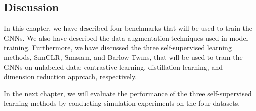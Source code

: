 \subsection{Discussion}

In this chapter, we have described four benchmarks that will be used to train the GNNs. We also have described the data augmentation techniques used in model training. Furthermore, we have discussed the three self-supervised learning methods, SimCLR, Simsiam, and Barlow Twins, that will be used to train the GNNs on unlabeled data: contrastive learning, distillation learning, and dimension reduction approach, respectively. 

In the next chapter, we will evaluate the performance of the three self-supervised learning methods by conducting simulation experiments on the four datasets.
